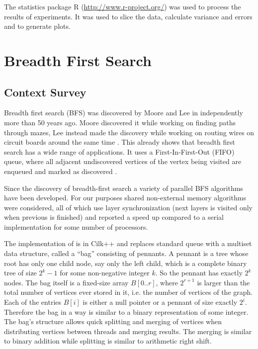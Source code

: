 \documentclass{report}
\theoremstyle{plain}
\theoremstyle{definition}
\theoremstyle{remark}
\begin{document}
The statistics package R (\url{http://www.r-project.org/}) was used to process the results of experiments. It was used to slice the data, calculate variance and errors and to generate plots.

\chapter{Breadth First Search}

\section{Context Survey}

Breadth first search (BFS) was discovered by Moore and Lee in independently more than 50 years ago. Moore discovered it while working on finding paths through mazes, Lee instead made the discovery while working on routing wires on circuit boards around the same time \cite{cormen2001introduction}. This already shows that breadth first search has a wide range of applications. It uses a First-In-First-Out (FIFO) queue, where all adjacent undiscovered vertices of the vertex being visited are enqueued and marked as discovered \cite{c++_sedgewick}.

Since the discovery of breadth-first search a variety of parallel BFS algorithms have been developed. For our purposes shared non-external memory algorithms \cite{Leiserson, bader2006designing, cong2008solving, zhang2006parallel} were considered, all of which use layer synchronization (next layers is visited only when previous is finished) and reported a speed up compared to a serial implementation for some number of processors.

The implementation of \cite{Leiserson} is in Cilk++ and replaces standard queue with a multiset data structure, called a ``bag'' consisting of pennants. A pennant is a tree whose root has only one child node, say only the left child, which is a complete binary tree of size $2^k-1$ for some non-negative integer $k$. So the pennant has exactly $2^k$ nodes. The bag itself is a fixed-size array $B[0..r]$, where $2^{r+1}$ is larger than the total number of vertices ever stored in it, i.e. the number of vertices of the graph. Each of the entries $B[i]$ is either a null pointer or a pennant of size exactly $2^i$. Therefore the bag in a way is similar to a binary representation of some integer. The bag's structure allows quick splitting and merging of vertices when distributing vertices between threads and merging results. The merging is similar to binary addition while splitting is similar to arithmetic right shift.
\end{document}
